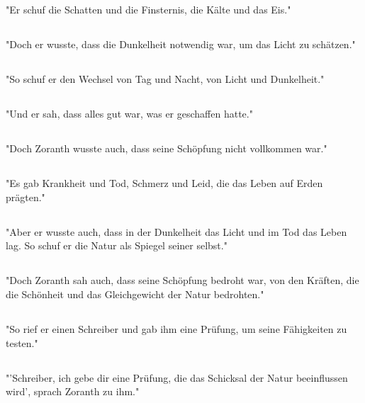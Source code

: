 \documentclass{article}
\begin{document}
\subsection{}
"Er schuf die Schatten und die Finsternis, die Kälte und das Eis."
\subsection{}
"Doch er wusste, dass die Dunkelheit notwendig war, um das Licht zu schätzen."
\subsection{}
"So schuf er den Wechsel von Tag und Nacht, von Licht und Dunkelheit."
\subsection{}
"Und er sah, dass alles gut war, was er geschaffen hatte."
\subsection{}
"Doch Zoranth wusste auch, dass seine Schöpfung nicht vollkommen war."
\subsection{}
"Es gab Krankheit und Tod, Schmerz und Leid, die das Leben auf Erden prägten."
\subsection{}
"Aber er wusste auch, dass in der Dunkelheit das Licht und im Tod das Leben lag. So schuf er die Natur als Spiegel seiner selbst."
\subsection{}
"Doch Zoranth sah auch, dass seine Schöpfung bedroht war, von den Kräften, die die Schönheit und das Gleichgewicht der Natur bedrohten."
\subsection{}
"So rief er einen Schreiber und gab ihm eine Prüfung, um seine Fähigkeiten zu testen."
\subsection{}
"'Schreiber, ich gebe dir eine Prüfung, die das Schicksal der Natur beeinflussen wird', sprach Zoranth zu ihm."
\end{document}
